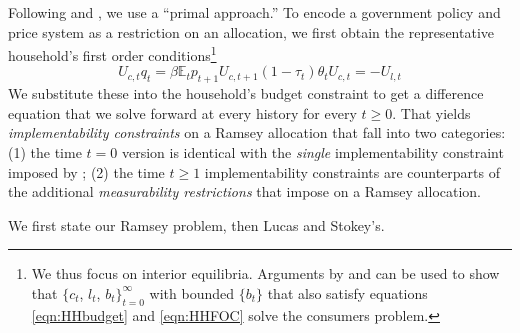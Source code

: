 \documentclass[12pt]{article}
\newcommand{\EE}{\mathbb E}
\begin{document}
Following \citet{LucasJr.1983}
and
\citet{Aiyagari2002}, we use a
``primal approach.''   To encode a  government policy and price system as a restriction on an allocation,
we  first obtain   the representative household's first order conditions\footnote{We thus focus on interior equilibria. Arguments by \cite{Magill1994} and \cite{Constantinides1996} can be used to show that  $\{c_t$, $l_t$, $b_t\}_{t=0}^\infty $ with bounded $\{b_t\}$ that also satisfy equations \eqref{eqn:HHbudget} and \eqref{eqn:HHFOC} solve the consumers problem.}
\begin{subequations}\label{eqn:HHFOC}
	\begin{equation}
	\label{eqn:Euler}
		U_{c,t} q_t = \beta \EE_t p_{t+1}U_{c,t+1}
	\end{equation}
	\begin{equation}\label{eqn:lcFOC}
		(1-\tau_t)\theta_tU_{c,t} = - U_{l,t}
	\end{equation}


\end{subequations}
We substitute these into the household's budget constraint to get a difference equation that we  solve forward   at every history for every $t \geq 0$.
That yields \textit{implementability constraints} on a Ramsey allocation that fall into two categories: (1) the time $t=0$ version is identical
with the {\em single} implementability constraint imposed by \citet{LucasJr.1983}; (2) the time $t \geq 1$ implementability constraints
are counterparts  of the additional
 \emph{measurability restrictions} that \citet{Aiyagari2002} impose on  a Ramsey allocation.
%





%
%
%
%
%
We first state our Ramsey problem, then Lucas and Stokey's.
\end{document}
